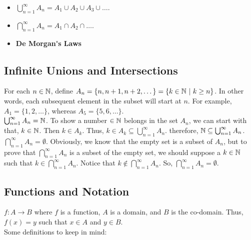 \begin{itemize}
\item $\displaystyle \bigcup^\infty_{n=1} A_n = A_1 \cup A_2 \cup A_3 \cup \dots$. \\

\item $\displaystyle \bigcap^\infty_{n=1} A_n = A_1 \cap A_2 \cap \dots$. \\

\item \textbf{\Gls{De Morgan's Laws}} \\
\end{itemize}


\pfs

\subsection{Infinite Unions and Intersections} \hfill

For each $n \in \mathbb{N}$, define $A_n = \{n, n+1, n+2,\dots\} = \{k \in \mathbb{N} \ | \ k \geq n\}$. In other words, each subsequent element in the subset will start at $n$. For example, $A_1 = \{1,2,\dots\}$, whereas $A_5 = \{5,6,\dots\}.$   \\

$\bigcup^\infty_{n=1} A_n = \mathbb{N}$. To show a number $\in \mathbb{N}$ belongs in the set $A_n$, we can start with that, $k \in \mathbb{N}$. Then $k \in A_k$. Thus, $k \in A_k \subseteq \bigcup^\infty_{n=1}A_n$. therefore, $\mathbb{N} \subseteq \bigcup^\infty_{n=1}A_n$. \\

$\bigcap^\infty_{n=1}A_n = \emptyset$. Obviously, we know that the empty set is a subset of $A_n$, but to prove that $\bigcap^\infty_{n=1}A_n$ is a subset of the empty set, we should suppose a $k \in \mathbb{N}$ such that $k \in \bigcap^\infty_{n=1}A_n$. Notice that $k \notin \bigcap^\infty_{n=1}A_n$. So, $\bigcap^\infty_{n=1}A_n = \emptyset$.

\pfs

\subsection{Functions and Notation} \hfill

$f \colon A \rightarrow B$ where $f$ is a function, $A$ is a domain, and $B$ is the co-domain. Thus, $f(x) = y$ such that $x \in A$ and $y \in B$. \\

Some definitions to keep in mind: \\

